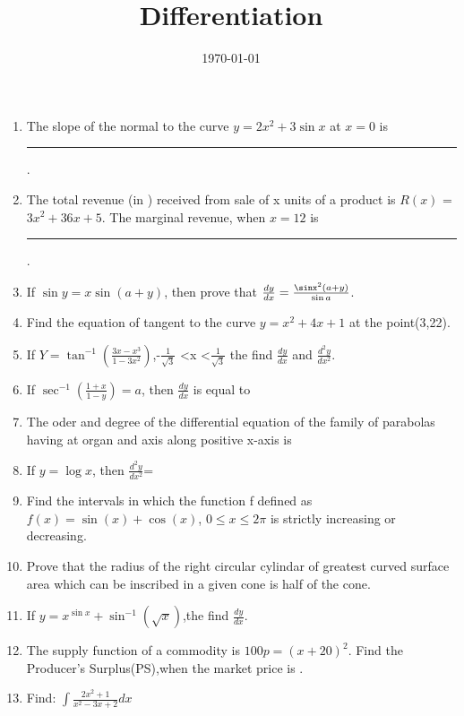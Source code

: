 \documentclass[12pt]{article}
\begin{document}
\title{\textbf{Differentiation}}
\date{\today}
\maketitle
\begin{enumerate}

\item
The slope of the normal to the curve $y=2x^2+3\sin{x}$ at $x=0$ is \rule{30pt}{1pt}.

\item
The total revenue (in \rupee) received from sale of x units of a product is $R(x)$ = $3x^2+36x+5$. The marginal revenue, when $x=12$ is \rule{30pt}{1pt}.

\item
If $\sin y = x \sin(a+y)$, then prove that $\frac {dy}{dx} = \frac {\sinx^2(a+y)}{\sin a}$.

\item
Find the equation of tangent to the curve $y=x^2+4x+1$ at the point(3,22).

\item
If $Y = \tan^{-1}\left(\frac{3x - x^3}{1 - 3x^2}\right)$,-$\frac{1}{\sqrt{3}}$ \textless x \textless $\frac{1}{\sqrt{3}}$
the find $\frac{dy}{dx}$ and $\frac{{d^2y}}{{dx^2}}$.

\item
If $\sec^{-1}\left(\frac{1+x}{1-y}\right)=a$, then $\frac{dy}{dx}$ is equal to

\item
The oder and degree of the differential equation of the family of parabolas having at 
organ and axis along positive x-axis is

\item
If $y = \log x$, then $\frac{{d^2y}}{{dx^2}}$=

\item
Find the intervals in which the function f defined as 
$f(x) = \sin(x) + \cos(x)$,
$0 \leq x \leq 2\pi$ is strictly increasing or decreasing.

\item
Prove that the radius of the right circular cylindar of greatest curved surface area which 
can be inscribed in a given cone is half of the cone.

\item
If $y=x^{\sin x }+\sin^{-1}(\sqrt x)$,the find $\frac{dy}{dx}$.

\item
The supply function of a commodity is $100p = (x+20)^2$. Find the Producer's Surplus(PS),when the market price is .

\item
Find:
$\int{\frac{2x^2 + 1}{x^2 - 3x + 2}}dx$


\end{enumerate}
\end{document}
